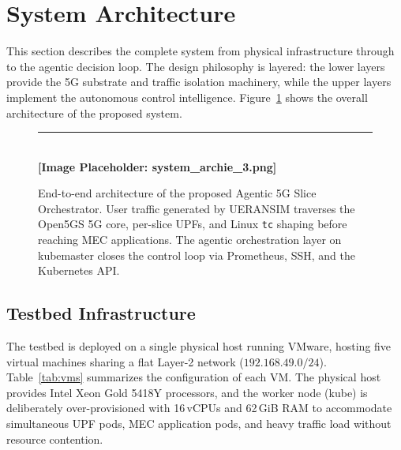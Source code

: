 \documentclass[12pt]{article}
\begin{document}
\section{System Architecture}
\label{sec:architecture}

This section describes the complete system from physical infrastructure
through to the agentic decision loop. The design philosophy is layered:
the lower layers provide the 5G substrate and traffic isolation machinery,
while the upper layers implement the autonomous control intelligence.
Figure~\ref{fig:sysarch} shows the overall architecture of the proposed
system.

\begin{figure}[H]
\centering
\rule{\textwidth}{6cm} \\ \vspace{0.5em}\centering\textbf{[Image Placeholder: system\_archie\_3.png]}
\caption{End-to-end architecture of the proposed Agentic 5G Slice
Orchestrator. User traffic generated by UERANSIM traverses the Open5GS
5G core, per-slice UPFs, and Linux \texttt{tc} shaping before reaching
MEC applications. The agentic orchestration layer on kubemaster closes
the control loop via Prometheus, SSH, and the Kubernetes API.}
\label{fig:sysarch}
\end{figure}

\subsection{Testbed Infrastructure}

The testbed is deployed on a single physical host running VMware, hosting
five virtual machines sharing a flat Layer-2 network
($192.168.49.0/24$). Table~\ref{tab:vms} summarizes the configuration
of each VM. The physical host provides Intel Xeon Gold 5418Y processors,
and the worker node (kube) is deliberately over-provisioned with
16\,vCPUs and 62\,GiB RAM to accommodate simultaneous UPF pods, MEC
application pods, and heavy traffic load without resource contention.
\end{document}
